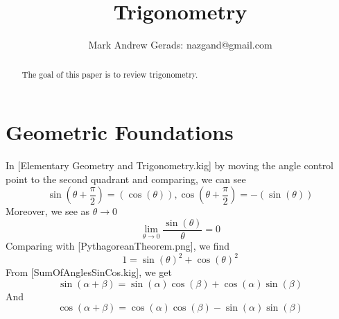 \documentclass[]{article}
\author{Mark Andrew Gerads: nazgand@gmail.com}
\title{Trigonometry}
\newcommand{\pqty}[1]{{\left(#1\right)}}
\numberwithin{equation}{section}
\begin{document}
	
	\maketitle
	
	\begin{abstract}
		The goal of this paper is to review trigonometry.
	\end{abstract}
	
	\section{Geometric Foundations}
	In [Elementary Geometry and Trigonometry.kig] by moving the angle control point to the second quadrant and comparing, we can see
	\begin{equation}
	\label{SinCosPhaseShift}
	\sin\pqty{\theta+\frac{\pi}{2}}=\pqty{\cos\pqty{\theta}}
	,
	\cos\pqty{\theta+\frac{\pi}{2}}=-\pqty{\sin\pqty{\theta}}
	\end{equation}
	Moreover, we see as \(\theta\to 0\)
	\begin{equation}
	\label{SinXOverXLimit}
	\lim\limits_{\theta\to 0}\frac{\sin\pqty{\theta}}{\theta}=0
	\end{equation}
	Comparing with [PythagoreanTheorem.png], we find
	\begin{equation}
	\label{SinCosPythagoras}
	1=\sin\pqty{\theta}^2+\cos\pqty{\theta}^2
	\end{equation}
	From [SumOfAnglesSinCos.kig], we get
	\begin{equation}
		\label{SinSumOfAngle}
		\sin\pqty{\alpha+\beta}=\sin\pqty{\alpha}\cos\pqty{\beta}+\cos\pqty{\alpha}\sin\pqty{\beta}
	\end{equation}
	And
	\begin{equation}
	\label{CosSumOfAngle}
	\cos\pqty{\alpha+\beta}=\cos\pqty{\alpha}\cos\pqty{\beta}-\sin\pqty{\alpha}\sin\pqty{\beta}
	\end{equation}
	
\end{document}
